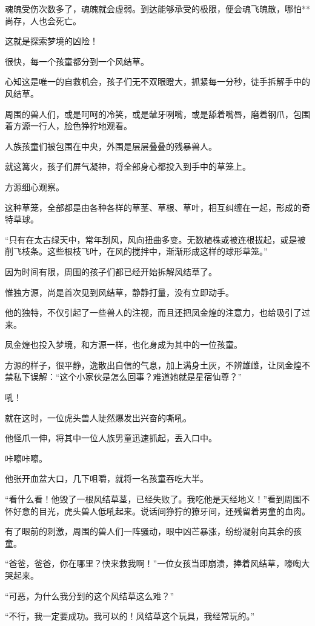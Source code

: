 \begin{this_body}
魂魄受伤次数多了，魂魄就会虚弱。到达能够承受的极限，便会魂飞魄散，哪怕**尚存，人也会死亡。

这就是探索梦境的凶险！

很快，每一个孩童都分到一个风结草。

心知这是唯一的自救机会，孩子们无不双眼瞪大，抓紧每一分秒，徒手拆解手中的风结草。

周围的兽人们，或是呵呵的冷笑，或是龇牙咧嘴，或是舔着嘴唇，磨着钢爪，包围着方源一行人，脸色狰狞地观看。

人族孩童们被包围在中央，外围是层层叠叠的残暴兽人。

就这篝火，孩子们屏气凝神，将全部身心都投入到手中的草笼上。

方源细心观察。

这种草笼，全部都是由各种各样的草茎、草根、草叶，相互纠缠在一起，形成的奇特草球。

“只有在太古绿天中，常年刮风，风向扭曲多变。无数植株或被连根拔起，或是被削飞枝条。这些根枝飞叶，在风的搅拌中，渐渐形成这样的球形草笼。”

因为时间有限，周围的孩子们都已经开始拆解风结草了。

惟独方源，尚是首次见到风结草，静静打量，没有立即动手。

他的独特，不仅引起了一些兽人的注视，而且还把凤金煌的注意力，也给吸引了过来。

凤金煌也投入梦境，和方源一样，也化身成为其中的一位孩童。

方源的样子，很平静，逸散出自信的气息，加上满身土灰，不辨雄雌，让凤金煌不禁私下误解：“这个小家伙是怎么回事？难道她就是星宿仙尊？”

吼！

就在这时，一位虎头兽人陡然爆发出兴奋的嘶吼。

他怪爪一伸，将其中一位人族男童迅速抓起，丢入口中。

咔嚓咔嚓。

他张开血盆大口，几下咀嚼，就将一名孩童吞吃大半。

“看什么看！他毁了一根风结草茎，已经失败了。我吃他是天经地义！”看到周围不怀好意的目光，虎头兽人低吼起来。说话间狰狞的獠牙间，还残留着男童的血肉。

有了眼前的刺激，周围的兽人们一阵骚动，眼中凶芒暴涨，纷纷凝射向其余的孩童。

“爸爸，爸爸，你在哪里？快来救我啊！”一位女孩当即崩溃，捧着风结草，嚎啕大哭起来。

“可恶，为什么我分到的这个风结草这么难？”

“不行，我一定要成功。我可以的！风结草这个玩具，我经常玩的。”


\end{this_body}
